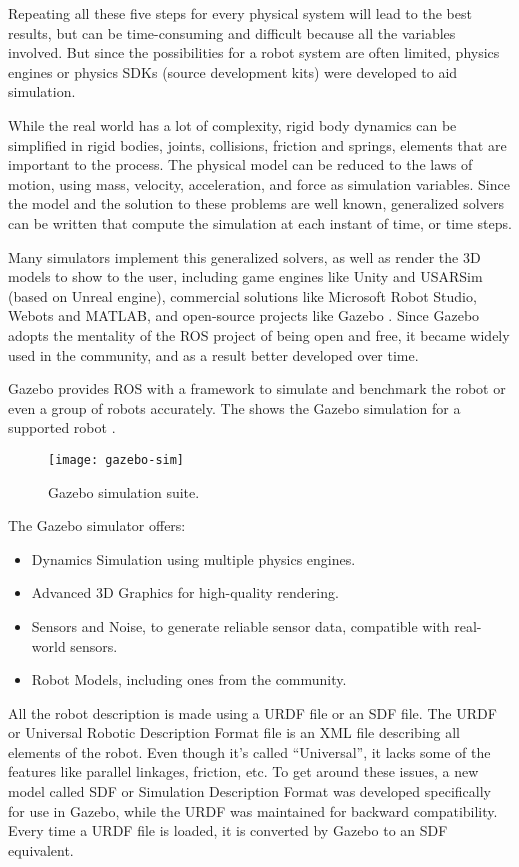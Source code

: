 Repeating all these five steps for every physical system will lead to the best results, but can be time-consuming and difficult because all the variables involved. But since the possibilities for a robot system are often limited, physics engines or physics SDKs (source development kits) were developed to aid simulation.

While the real world has a lot of complexity, rigid body dynamics can be simplified in rigid bodies, joints, collisions, friction and springs, elements that are important to the process. The physical model can be reduced to the laws of motion, using mass, velocity, acceleration, and force as simulation variables. Since the model and the solution to these problems are well known, generalized solvers can be written that compute the simulation at each instant of time, or time steps.

Many simulators implement this generalized solvers, as well as render the 3D models to show to the user, including game engines like Unity and USARSim (based on Unreal engine), commercial solutions like Microsoft Robot Studio, Webots and MATLAB, and open-source projects like Gazebo \cite{craighead2007survey}. Since Gazebo adopts the mentality of the ROS project of being open and free, it became widely used in the community, and as a result better developed over time.

Gazebo provides ROS with a framework to simulate and benchmark the robot or even a group of robots accurately. The  shows the Gazebo simulation for a supported robot \cite{koenig2004design}.

\begin{figure}[!ht]
\centering
\texttt{[image: gazebo-sim]}
\caption{Gazebo simulation suite.}
\label{fig:gazebo-sim}
\end{figure}

The Gazebo simulator offers:

\begin{itemize}
\item Dynamics Simulation using multiple physics engines.
\item Advanced 3D Graphics for high-quality rendering.
\item Sensors and Noise, to generate reliable sensor data, compatible with real-world sensors.
\item Robot Models, including ones from the community.
\end{itemize}

All the robot description is made using a URDF file or an SDF file. The URDF or Universal Robotic Description Format file is an XML file describing all elements of the robot. Even though it's called ``Universal'', it lacks some of the features like parallel linkages, friction, etc. To get around these issues, a new model called SDF or  Simulation Description Format was developed specifically for use in Gazebo, while the URDF was maintained for backward compatibility. Every time a URDF file is loaded, it is converted by Gazebo to an SDF equivalent.

